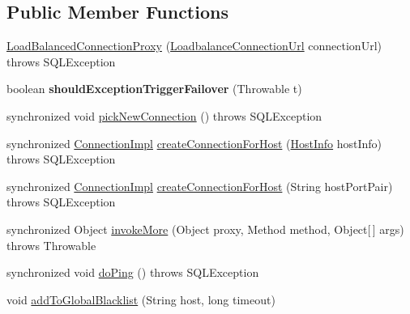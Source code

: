 \subsection*{Public Member Functions}
\begin{DoxyCompactItemize}
\item 
\mbox{\hyperlink{classcom_1_1mysql_1_1cj_1_1jdbc_1_1ha_1_1_load_balanced_connection_proxy_a236928d6a49c1bbc3dfd6e4615a34f0d}{Load\+Balanced\+Connection\+Proxy}} (\mbox{\hyperlink{classcom_1_1mysql_1_1cj_1_1conf_1_1url_1_1_loadbalance_connection_url}{Loadbalance\+Connection\+Url}} connection\+Url)  throws S\+Q\+L\+Exception 
\item 
\mbox{\label{classcom_1_1mysql_1_1cj_1_1jdbc_1_1ha_1_1_load_balanced_connection_proxy_a89ff36a24aa0df79fb9363ef5c6e5be2}} 
boolean {\bfseries should\+Exception\+Trigger\+Failover} (Throwable t)
\item 
synchronized void \mbox{\hyperlink{classcom_1_1mysql_1_1cj_1_1jdbc_1_1ha_1_1_load_balanced_connection_proxy_a3a91f1004880ec0566519ad4af6e3c34}{pick\+New\+Connection}} ()  throws S\+Q\+L\+Exception 
\item 
synchronized \mbox{\hyperlink{classcom_1_1mysql_1_1cj_1_1jdbc_1_1_connection_impl}{Connection\+Impl}} \mbox{\hyperlink{classcom_1_1mysql_1_1cj_1_1jdbc_1_1ha_1_1_load_balanced_connection_proxy_ad26b7e7a242eeab7a90983f6e5095779}{create\+Connection\+For\+Host}} (\mbox{\hyperlink{classcom_1_1mysql_1_1cj_1_1conf_1_1_host_info}{Host\+Info}} host\+Info)  throws S\+Q\+L\+Exception 
\item 
synchronized \mbox{\hyperlink{classcom_1_1mysql_1_1cj_1_1jdbc_1_1_connection_impl}{Connection\+Impl}} \mbox{\hyperlink{classcom_1_1mysql_1_1cj_1_1jdbc_1_1ha_1_1_load_balanced_connection_proxy_a27662d65e82acb86f3cc6af3f4f331ee}{create\+Connection\+For\+Host}} (String host\+Port\+Pair)  throws S\+Q\+L\+Exception 
\item 
synchronized Object \mbox{\hyperlink{classcom_1_1mysql_1_1cj_1_1jdbc_1_1ha_1_1_load_balanced_connection_proxy_a77ff10a73000704f3d23fbe59510bab4}{invoke\+More}} (Object proxy, Method method, Object\mbox{[}$\,$\mbox{]} args)  throws Throwable 
\item 
synchronized void \mbox{\hyperlink{classcom_1_1mysql_1_1cj_1_1jdbc_1_1ha_1_1_load_balanced_connection_proxy_a735361812f6c57f687ad6512e4bd3809}{do\+Ping}} ()  throws S\+Q\+L\+Exception 
\item 
void \mbox{\hyperlink{classcom_1_1mysql_1_1cj_1_1jdbc_1_1ha_1_1_load_balanced_connection_proxy_aa51cafef5f72668308cba5c93c1ec2be}{add\+To\+Global\+Blacklist}} (String host, long timeout)

\end{DoxyCompactItemize}
